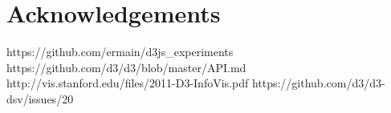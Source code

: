 \documentclass[a4paper]{article}
\begin{document}
\section{Acknowledgements}


\begin{thebibliography}{9}
 https://github.com/ermain/d3js\_experiments
 https://github.com/d3/d3/blob/master/API.md
 http://vis.stanford.edu/files/2011-D3-InfoVis.pdf
 https://github.com/d3/d3-dsv/issues/20
\end{thebibliography}

\end{document}
